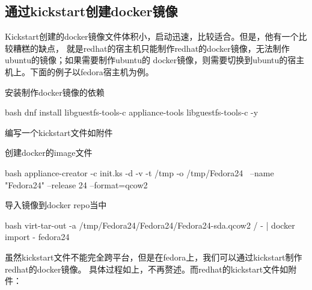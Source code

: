 \subsection{通过kickstart创建docker镜像}
Kickstart创建的docker镜像文件体积小，启动迅速，比较适合。但是，他有一个比较糟糕的缺点，
就是redhat的宿主机只能制作redhat的docker镜像，无法制作ubuntu的镜像；如果需要制作ubuntu的
docker镜像，则需要切换到ubuntu的宿主机上。下面的例子以fedora宿主机为例。
\begin{outline}[enumerate]
  \1 安装制作docker镜像的依赖
\begin{code-in-enumerate}{bash}
dnf install libguestfs-tools-c appliance-tools libguestfs-tools-c -y
\end{code-in-enumerate}

  \1 编写一个kickstart文件如附件

  \1 创建docker的image文件
\begin{code-in-enumerate}{bash}
appliance-creator -c init.ks -d -v -t /tmp -o /tmp/Fedora24 \
      --name "Fedora24" --release 24 --format=qcow2
\end{code-in-enumerate}

  \1 导入镜像到docker repo当中
\begin{code-in-enumerate}{bash}
virt-tar-out -a /tmp/Fedora24/Fedora24/Fedora24-sda.qcow2 / - | docker import - fedora24
\end{code-in-enumerate}
\end{outline}

虽然kickstart文件不能完全跨平台，但是在fedora上，我们可以通过kickstart制作redhat的docker镜像。
具体过程如上，不再赘述。而redhat的kickstart文件如附件：

